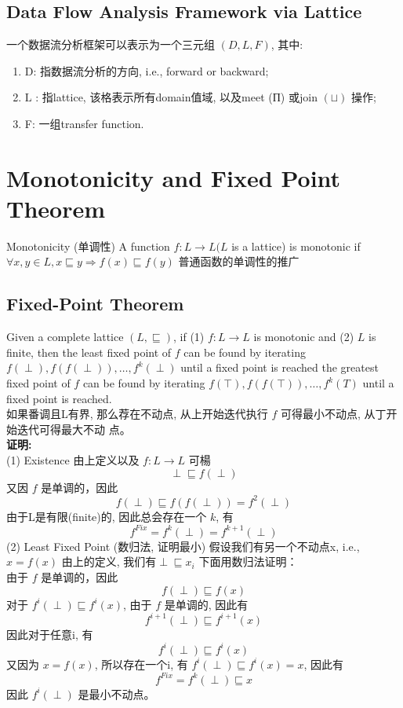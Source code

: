 \documentclass[a4paper]{article}
\theoremstyle{definition}
\begin{document}
\subsection{Data Flow Analysis Framework via Lattice}
一个数据流分析框架可以表示为一个三元组 $(D, L, F)$, 其中:
\begin{enumerate}
\item D: 指数据流分析的方向, i.e., forward or backward;
\item $\mathrm{L}$ : 指lattice, 该格表示所有domain值域, 以及meet (П) 或join $(\sqcup)$ 操作;
\item F: 一组transfer function.
\end{enumerate}

\section{Monotonicity and Fixed Point Theorem}
Monotonicity (单调性)
A function $f: L \rightarrow L(L$ is a lattice) is monotonic if $\forall x, y \in L, x \sqsubseteq y \Longrightarrow f(x) \sqsubseteq f(y)$
普通函数的单调性的推广
\subsection{Fixed-Point Theorem}
Given a complete lattice $(L, \sqsubseteq)$, if (1) $f: L \rightarrow L$ is monotonic and (2) $L$ is finite, then the least fixed point of $f$ can be found by iterating $f(\perp), f(f(\perp)), \ldots, f^{k}(\perp)$ until a fixed
point is reached the greatest fixed point of $f$ can be found by iterating
$f(\top), f(f(\top)), \ldots, f^{k}(T)$ until a fixed point is reached.\\
如果番调且L有界, 那么荐在不动点, 从上开始迭代执行 $f$ 可得最小不动点, 从丁开始迭代可得最大不动
点。\\
\textbf{证明:}\\
(1) Existence
由上定义以及 $f: L \rightarrow L$ 可楊
$$
\perp \sqsubseteq f(\perp)
$$
又因 $f$ 是单调的，因此
$$
f(\perp) \sqsubseteq f(f(\perp))=f^{2}(\perp)
$$
由于L是有限(finite)的, 因此总会存在一个 $k$, 有
$$
f^{F i x}=f^{k}(\perp)=f^{k+1}(\perp)
$$
(2) Least Fixed Point (数归法, 证明最小)
假设我们有另一个不动点x, i.e., $x=f(x)$
由上的定义, 我们有$\perp\sqsubseteq x_{i}$
下面用数归法证明：\\
由于 $f$ 是单调的，因此
$$
f(\perp) \sqsubseteq f(x)
$$
对于 $f^{i}(\perp) \sqsubseteq f^{i}(x)$, 由于 $f$ 是单调的, 因此有
$$
f^{i+1}(\perp) \sqsubseteq f^{i+1}(x)
$$
因此对于任意i, 有
$$
f^{i}(\perp) \sqsubseteq f^{i}(x)
$$
又因为 $x=f(x)$, 所以存在一个i, 有 $f^{i}(\perp) \sqsubseteq f^{i}(x)=x$, 因此有
$$
f^{F i x}=f^{k}(\perp) \sqsubseteq x
$$
因此 $f^{i}(\perp)$ 是最小不动点。
\end{document}
